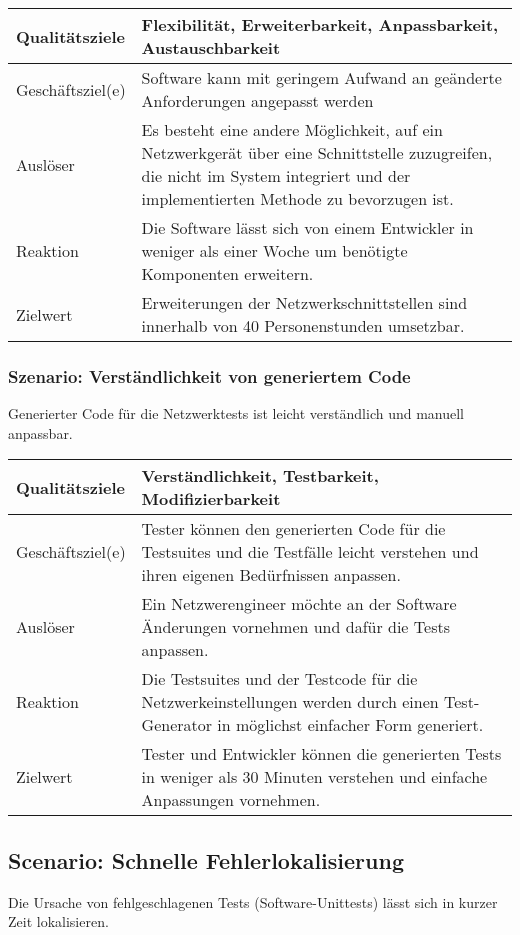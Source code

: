 \documentclass[
	ngerman,
	toc=listof, %
	toc=bibliography, %
	footnotes=multiple, %
	parskip=half, %
	numbers=noendperiod %
]{scrartcl}
\begin{document}
			\begin{tabularx}{\textwidth}{lX}
				\toprule
				Qualitätsziele & Flexibilität, Erweiterbarkeit, Anpassbarkeit, Austauschbarkeit  \\
				\midrule
				Geschäftsziel(e) & Software kann mit geringem Aufwand an geänderte Anforderungen angepasst werden  \\
				\midrule
				Auslöser & Es besteht eine andere Möglichkeit, auf ein Netzwerkgerät über eine Schnittstelle zuzugreifen, die nicht im System integriert und der implementierten Methode zu bevorzugen ist.  \\
				\midrule
				Reaktion & Die Software lässt sich von einem Entwickler in weniger als einer Woche um benötigte Komponenten erweitern.  \\
				\midrule
				Zielwert & 	Erweiterungen der Netzwerkschnittstellen sind innerhalb von 40 Personenstunden umsetzbar.  \\
				\bottomrule
			\end{tabularx}

		\subsubsection{Szenario: Verständlichkeit von generiertem Code}
			Generierter Code für die Netzwerktests ist leicht verständlich und manuell anpassbar.

			\begin{tabularx}{\textwidth}{lX}
				\toprule
				Qualitätsziele & Verständlichkeit, Testbarkeit, Modifizierbarkeit  \\
				\midrule
				Geschäftsziel(e) &  Tester können den generierten Code für die Testsuites und die Testfälle leicht verstehen und ihren eigenen Bedürfnissen anpassen. \\
				\midrule
				Auslöser & Ein Netzwerengineer möchte an der Software Änderungen vornehmen und dafür die Tests anpassen.  \\
				\midrule
				Reaktion & Die Testsuites und der Testcode für die Netzwerkeinstellungen werden durch einen Test-Generator in möglichst einfacher Form generiert. \\
				\midrule
				Zielwert & Tester und Entwickler können die generierten Tests in weniger als 30 Minuten verstehen und einfache Anpassungen vornehmen. \\
				\bottomrule
			\end{tabularx}

		\subsection{Scenario: Schnelle Fehlerlokalisierung}
			Die Ursache von fehlgeschlagenen Tests (Software-Unittests) lässt sich in kurzer Zeit lokalisieren.
\end{document}
